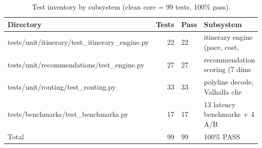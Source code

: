 \begin{table}[h]\centering\small
\caption{Test inventory by subsystem (clean core = 99 tests, 100\% pass).}
\label{tab:tests}\begin{tabular}{lrll}
\toprule Directory & Tests & Pass & Subsystem \\ \midrule
tests/unit/itinerary/test\_itinerary\_engine.py & 22 & 22 & itinerary engine (pace, cost,  \\
tests/unit/recommendations/test\_engine.py & 27 & 27 & recommendation scoring (7 dims \\
tests/unit/routing/test\_routing.py & 33 & 33 & polyline decode, Valhalla clie \\
tests/benchmarks/test\_benchmarks.py & 17 & 17 & 13 latency benchmarks + 4 A/B  \\
\midrule Total & 99 & 99 & 100\% PASS \\
\bottomrule\end{tabular}\end{table}
